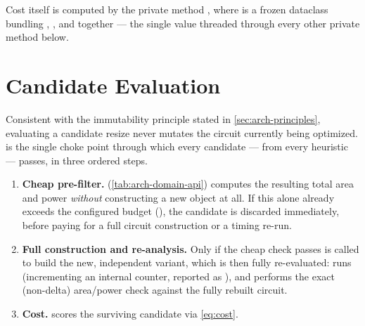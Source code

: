 Cost itself is computed by the private method
, where  is a frozen dataclass bundling
, , and  together --- the single
value threaded through every other private method below.

\section{Candidate Evaluation}
\label{sec:opt-eval}

Consistent with the immutability principle stated in
\cref{sec:arch-principles}, evaluating a candidate resize never mutates the
circuit currently being optimized.
 is the single choke
point through which every candidate --- from every heuristic --- passes,
in three ordered steps.

\begin{enumerate}
    \item \textbf{Cheap pre-filter.}
           (\cref{tab:arch-domain-api}) computes the
          resulting total area and power \emph{without} constructing a new
           object at all. If this alone already exceeds the
          configured budget
          (), the candidate
          is discarded immediately, before paying for a full circuit
          construction or a timing re-run.
    \item \textbf{Full construction and re-analysis.} Only if the cheap
          check passes is  called to build the new, independent
           variant, which is then fully re-evaluated:
           runs 
          (incrementing an internal  counter,
          reported as ), and
           performs the exact
          (non-delta) area/power check against the fully rebuilt circuit.
    \item \textbf{Cost.} 
          scores the surviving candidate via \cref{eq:cost}.
\end{enumerate}

